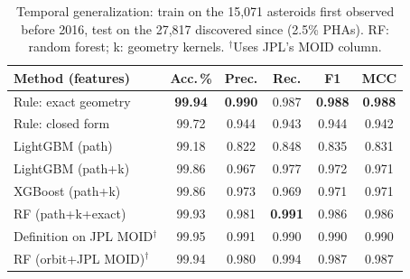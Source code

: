 \begin{table}[t]
\centering
\footnotesize
\caption{Temporal generalization: train on the 15,071 asteroids first observed before 2016, test on the 27,817 discovered since (2.5\% PHAs). RF: random forest; k: geometry kernels. $^\dagger$Uses JPL's MOID column.}
\label{tab:temporal}
\setlength{\tabcolsep}{2pt}
\begin{tabular}{@{}lccccc@{}}
\toprule
Method (features) & Acc.\,\% & Prec. & Rec. & F1 & MCC \\
\midrule
Rule: exact geometry & \textbf{99.94} & \textbf{0.990} & 0.987 & \textbf{0.988} & \textbf{0.988} \\
Rule: closed form & 99.72 & 0.944 & 0.943 & 0.944 & 0.942 \\
LightGBM (path) & 99.18 & 0.822 & 0.848 & 0.835 & 0.831 \\
LightGBM (path+k) & 99.86 & 0.967 & 0.977 & 0.972 & 0.971 \\
XGBoost (path+k) & 99.86 & 0.973 & 0.969 & 0.971 & 0.971 \\
RF (path+k+exact) & 99.93 & 0.981 & \textbf{0.991} & 0.986 & 0.986 \\
\midrule
Definition on JPL MOID$^\dagger$ & 99.95 & 0.991 & 0.990 & 0.990 & 0.990 \\
RF (orbit+JPL MOID)$^\dagger$ & 99.94 & 0.980 & 0.994 & 0.987 & 0.987 \\
\bottomrule
\end{tabular}
\end{table}
